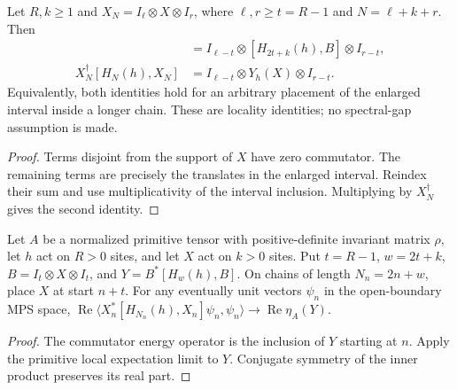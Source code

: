 \begin{lemma}
    \label{thm:finite_open_commutator_locality}
    \leanok
    Let $R,k\geq1$ and $X_N=I_\ell\otimes X\otimes I_r$, where
    $\ell,r\geq t=R-1$ and $N=\ell+k+r$. Then
    \begin{align}
        [H_N(h),X_N]
         & =I_{\ell-t}\otimes[H_{2t+k}(h),B]\otimes I_{r-t}, \\
        X_N^\dagger[H_N(h),X_N]
         & =I_{\ell-t}\otimes Y_h(X)\otimes I_{r-t}.
    \end{align}
    Equivalently, both identities hold for an arbitrary placement of the
    enlarged interval inside a longer chain. These are locality identities;
    no spectral-gap assumption is made.
\end{lemma}
\begin{proof}\leanok
    Terms disjoint from the support of $X$ have zero commutator. The remaining
    terms are precisely the translates in the enlarged interval. Reindex
    their sum and use multiplicativity of the interval inclusion. Multiplying
    by $X_N^\dagger$ gives the second identity.
\end{proof}

\begin{lemma}
    \label{thm:primitive_local_commutator_energy_limit}
    \leanok
    Let $A$ be a normalized primitive tensor with positive-definite invariant
    matrix $\rho$, let $h$ act on $R>0$ sites, and let $X$ act on $k>0$
    sites. Put $t=R-1$, $w=2t+k$, $B=I_t\otimes X\otimes I_t$, and
    $Y=B^*[H_w(h),B]$. On chains of length $N_n=2n+w$, place $X$ at
    start $n+t$. For any eventually unit vectors $\psi_n$ in the
    open-boundary MPS space,
    $\operatorname{Re}\langle X_n^*[H_{N_n}(h),X_n]\psi_n,\psi_n\rangle
        \to\operatorname{Re}\eta_A(Y)$.
\end{lemma}
\begin{proof}\leanok
    The commutator energy operator is the inclusion of $Y$ starting at $n$.
    Apply the primitive local expectation limit to $Y$.
    Conjugate symmetry of the inner product preserves its real part.
\end{proof}

